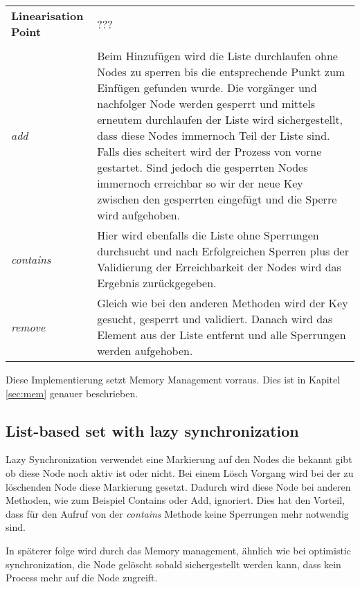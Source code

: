 \begin{table}[H]
    \begin{tabularx}{\textwidth}{lX}
        \textbf{Linearisation Point} & ???\\
        \\
        \textit{add} & Beim Hinzufügen wird die Liste durchlaufen ohne Nodes zu sperren bis die entsprechende Punkt zum Einfügen gefunden wurde. Die vorgänger und nachfolger Node werden gesperrt und mittels erneutem durchlaufen der Liste wird sichergestellt, dass diese Nodes immernoch Teil der Liste sind. Falls dies scheitert wird der Prozess von vorne gestartet. Sind jedoch die gesperrten Nodes immernoch erreichbar so wir der neue Key zwischen den gesperrten eingefügt und die Sperre wird aufgehoben.\\
        \textit{contains} & Hier wird ebenfalls die Liste ohne Sperrungen durchsucht und nach Erfolgreichen Sperren plus der Validierung der Erreichbarkeit der Nodes wird das Ergebnis zurückgegeben.\\
        \textit{remove} & Gleich wie bei den anderen Methoden wird der Key gesucht, gesperrt und validiert. Danach wird das Element aus der Liste entfernt und alle Sperrungen werden aufgehoben.\\
    \end{tabularx}
\end{table}

Diese Implementierung setzt Memory Management vorraus. Dies ist in Kapitel \ref{sec:mem} genauer beschrieben.

\subsection{List-based set with lazy synchronization}

Lazy Synchronization verwendet eine Markierung auf den Nodes die bekannt gibt ob diese Node noch aktiv ist oder nicht. Bei einem Lösch Vorgang wird bei der zu löschenden Node diese Markierung gesetzt. Dadurch wird diese Node bei anderen Methoden, wie zum Beispiel Contains oder Add, ignoriert. Dies hat den Vorteil, dass für den Aufruf von der \textit{contains} Methode keine Sperrungen mehr notwendig sind.

In späterer folge wird durch das Memory management, ähnlich wie bei optimistic synchronization, die Node gelöscht sobald sichergestellt werden kann, dass kein Process mehr auf die Node zugreift.

